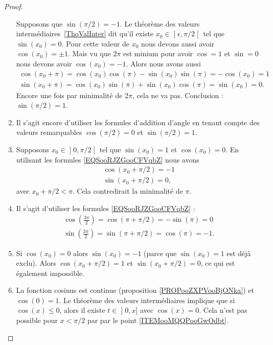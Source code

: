 \begin{proof}
\begin{enumerate}
			      Supposons que \( \sin(\pi/2)=-1\). Le théorème des valeurs intermédiaires~\ref{ThoValInter} dit qu'il existe \( x_0\in\mathopen] \epsilon , \pi/2 \mathclose[\) tel que \( \sin(x_0)=0\). Pour cette valeur de \( x_0\) nous devons aussi avoir \( \cos(x_0)=\pm 1\). Mais vu que \( 2\pi\) est minium pour avoir \( \cos=1\) et \( \sin=0\) nous devons avoir \( \cos(x_0)=-1\). Alors nous avons aussi
		      \begin{subequations}
			      \begin{align}
				      \cos(x_0+\pi)=\cos(x_0)\cos(\pi)-\sin(x_0)\sin(\pi)=-\cos(x_0)=1 \\
				      \sin(x_0+\pi)=\cos(x_0)\sin(\pi)+\sin(x_0)\cos(\pi)=\sin(x_0)=0.
			      \end{align}
		      \end{subequations}
		      Encore une fois par minimalité de \( 2\pi\), cela ne va pas. Conclusion : \( \sin(\pi/2)=1\).
		\item
		      Il s'agit encore d'utiliser les formules d'addition d'angle en tenant compte des valeurs remarquables \( \cos(\pi/2)=0\) et \( \sin(\pi/2)=1\).
		\item
		      Supposons \( x_0\in\mathopen] 0 , \pi/2 \mathclose[\) tel que \( \sin(x_0)=1\) et \( \cos(x_0)=0\). En utilisant les formules \eqref{EQSooRJZGooCFVqbZ} nous avons
		      \begin{subequations}
			      \begin{align}
				      \cos(x_0+\pi/2)=-1 \\
				      \sin(x_0+\pi/2)=0,
			      \end{align}
		      \end{subequations}
		      avec \( x_0+\pi/2<\pi\). Cela contredirait la minimalité de \( \pi\).
		\item
		      Il s'agit d'utiliser les formules \eqref{EQSooRJZGooCFVqbZ} :
		      \begin{subequations}
			      \begin{align}
				      \cos(\frac{ 3\pi }{ 2 })=\cos(\pi+\pi/2)=-\sin(\pi)=0 \\
				      \sin(\frac{ 3\pi }{ 2 })=\sin(\pi+\pi/2)=\cos(\pi)=-1.
			      \end{align}
		      \end{subequations}
		\item
		      Si \( \cos(x_0)=0\) alors \( \sin(x_0)=-1\) (parce que \( \sin(x_0)=1\) est déjà exclu). Alors \( \cos(x_0+\pi/2)=1\) et \( \sin(x_0+\pi/2)=0\), ce qui est également impossible.
		\item
		      La fonction cosinus est continue (proposition \ref{PROPooZXPVooBjONka}) et \( \cos(0)=1\). Le théorème des valeurs intermédiaires implique que si \( \cos(x)\leq 0\), alors il existe \( t\in \mathopen] 0 , x \mathclose]\) avec \( \cos(x)=0\). Cela n'est pas possible pour \( x<\pi/2\) par par le point \ref{ITEMooMQQPooGwOdbt}.


\end{enumerate}
\end{proof}
